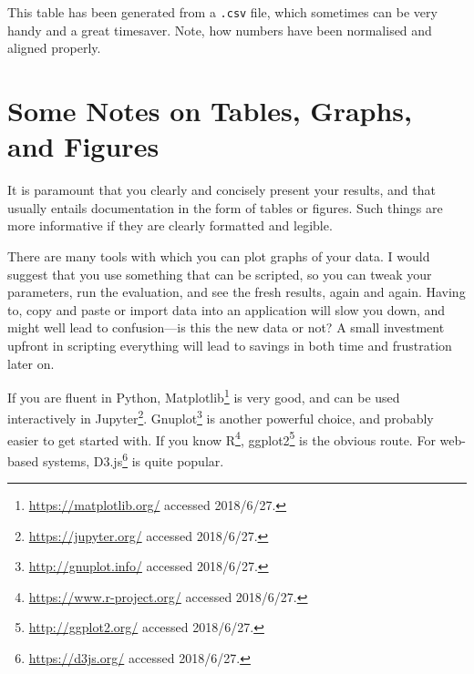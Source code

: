 \begin{table}
  \myfloatalign
  \caption[An auto-generated table]{This table has been generated from a
    \texttt{.csv} file, which sometimes can be very handy and a great timesaver. Note, how numbers have been normalised and aligned properly.}
  \label{tab:pretty-table}
\end{table}



\section{Some Notes on Tables, Graphs, and Figures}
\label{sec:some-notes-tables}

It is paramount that you clearly and concisely present your results, and
that usually entails documentation in the form of tables or figures.  Such
things are more informative if they are clearly formatted and legible.

There are many tools with which you can plot graphs of your data. I would
suggest that you use something that can be scripted, so you can tweak your
parameters, run the evaluation, and see the fresh results, again and
again. Having to, \eg copy and paste or import data into an application will
slow you down, and might well lead to confusion---is this the new data or not?
A small investment upfront in scripting everything will lead to savings in
both time and frustration later on.

If you are fluent in Python,
Matplotlib\footnote{\url{https://matplotlib.org/} accessed 2018/6/27.} is
very good, and can be used interactively in
Jupyter\footnote{\url{https://jupyter.org/} accessed
  2018/6/27.}. Gnuplot\footnote{\url{http://gnuplot.info/} accessed
  2018/6/27.}  is another powerful choice, and probably easier to get
started with. If you know R\footnote{\url{https://www.r-project.org/}
  accessed 2018/6/27.}, ggplot2\footnote{\url{http://ggplot2.org/} accessed
  2018/6/27.} is the obvious route.  For web-based systems,
D3.js\footnote{\url{https://d3js.org/} accessed 2018/6/27.} is quite
popular.

